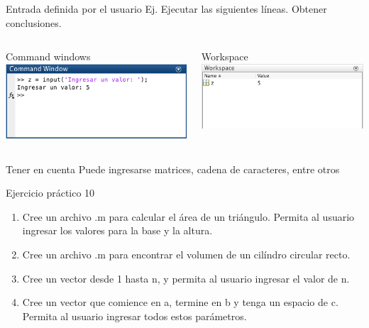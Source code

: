 \documentclass{bredelebeamer}
\begin{document}
\begin{frame}{Entrada definida por el usuario}
Ej. Ejecutar las siguientes líneas. Obtener conclusiones.
\begin{columns}
\begin{column}{0.5\textwidth}
\begin{center}
Command windows
\includegraphics[scale=0.3]{images/pantalla1.png}
\end{center}
\end{column}
\begin{column}{0.3\textwidth}
\begin{center}
Workspace
\includegraphics[scale=0.3]{images/pantalla2.png}
\end{center}
\end{column}
\end{columns}
\begin{block}{Tener en cuenta}
Puede ingresarse matrices, cadena de caracteres, entre otros
\end{block}
\end{frame}

\begin{frame}{Ejercicio práctico 10}
\begin{enumerate}
\item Cree un archivo .m para calcular el área de un triángulo. Permita al usuario ingresar los valores para la base y la altura.
\item Cree un archivo .m para encontrar el volumen de un cilíndro circular recto.
\item Cree un vector desde 1 hasta n, y permita al usuario ingresar el valor de n.
\item Cree un vector que comience en a, termine en b y tenga un espacio de c. Permita al usuario ingresar todos estos parámetros.
\end{enumerate}
\end{frame}
\end{document}
